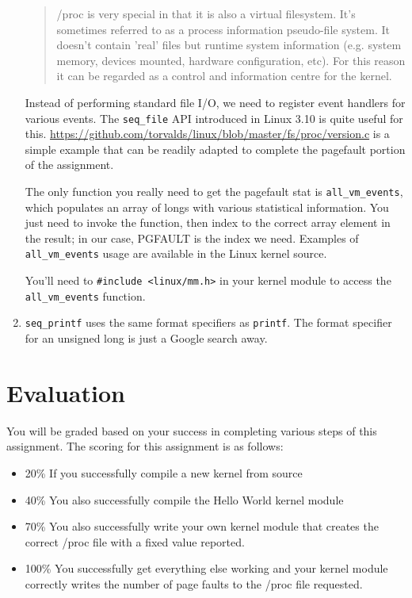 \documentclass[11pt]{article}
\begin{document}
\begin{enumerate}
\begin{quote}
/proc is very special in that it is also a virtual filesystem. It's sometimes referred to as a process information pseudo-file system. It doesn't contain 'real' files but runtime system information (e.g. system memory, devices mounted, hardware configuration, etc). For this reason it can be regarded as a control and information centre for the kernel.
\end{quote}

Instead of performing standard file I/O, we need to register event handlers for various events. The \texttt{seq\_file} API\cite{seqfile} introduced in Linux 3.10 is quite useful for this. \url{https://github.com/torvalds/linux/blob/master/fs/proc/version.c} is a simple example that can be readily adapted to complete the pagefault portion of the assignment.
\begin{item} The only function you really need to get the pagefault stat is \texttt{all\_vm\_events}\cite{vmevents}, which populates an array of longs with various statistical information. You just need to invoke the function, then index to the correct array element in the result; in our case, PGFAULT is the index we need. Examples of \texttt{all\_vm\_events} usage are available in the Linux kernel source\cite{vmeventsusage}.


You'll need to \texttt{\#include <linux/mm.h>} in your kernel module to access the \texttt{all\_vm\_events} function.
\end{item}
\item \texttt{seq\_printf} uses the same format specifiers as \texttt{printf}. The format specifier for an unsigned long is just a Google search away.
\end{enumerate}

\section*{Evaluation}

You will be graded based on your success in completing various steps of this assignment. The scoring for this assignment is as follows:

\begin{itemize}
\item 20\% If you successfully compile a new kernel from source
\item 40\% You also successfully compile the Hello World kernel module
\item 70\% You also successfully write your own kernel module that creates the correct /proc file with a fixed value reported.
\item 100\% You successfully get everything else working and your kernel module correctly writes the number of page faults to the /proc file requested. 
\end{itemize}
\end{document}
